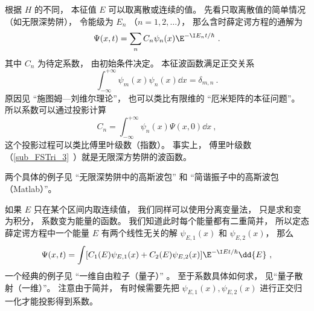 根据 $H$ 的不同， 本征值 $E$ 可以取离散或连续的值。 先看只取离散值的简单情况（如无限深势阱）， 令能级为 $E_n$ （$n = 1, 2, \dots$）， 那么含时薛定谔方程的通解为
\begin{equation}\label{eq_TDSE11_5}
\Psi(x, t) = \sum_n C_n \psi_n(x) \E^{-\I E_n t/\hbar}~.
\end{equation}
其中 $C_n$ 为待定系数， 由初始条件决定。 本征波函数满足正交关系
\begin{equation}
\int_{-\infty}^{+\infty}\psi_m(x)\psi_n(x)\dd{x} = \delta_{m,n}~.
\end{equation}
原因见 “施图姆—刘维尔理论”， 也可以类比有限维的 “厄米矩阵的本征问题”。 所以系数可以通过投影计算
\begin{equation}
C_n = \int_{-\infty}^{+\infty} \psi_n(x)\Psi(x, 0) \dd{x}~,
\end{equation}
这个投影过程可以类比傅里叶级数（指数）。 事实上， 傅里叶级数（\autoref{sub_FSTri_3}~）就是无限深方势阱的波函数。

两个具体的例子见 “无限深势阱中的高斯波包” 和 “简谐振子中的高斯波包（Matlab）”。

如果 $E$ 只在某个区间内取连续值， 我们同样可以使用分离变量法， 只是求和变为积分， 系数变为能量的函数。 我们知道此时每个能量都有二重简并， 所以定态薛定谔方程中一个能量 $E$ 有两个线性无关的解 $\psi_{E,1}(x)$ 和 $\psi_{E,2}(x)$， 那么
\begin{equation}\label{eq_TDSE11_4}
\Psi(x, t) = \int [C_1(E) \psi_{E,1}(x) + C_2(E) \psi_{E,2}(x)] \E^{-\I E t/\hbar} \dd{E}~,
\end{equation}
一个经典的例子见 “一维自由粒子（量子）” 。 至于系数具体如何求， 见“量子散射（一维）”。 注意由于简并， 有时候需要先把 $\psi_{E,1}(x), \psi_{E,2}(x)$ 进行正交归一化才能投影得到系数。
